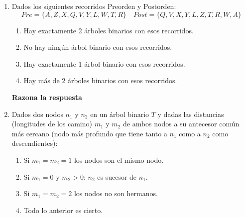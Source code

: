 \documentclass[12pt]{article}
\begin{document}
\begin{ejercicio}[1 punto]
\begin{enumerate}[label=(\alph*)]
            \item Dados los siguientes recorridos Preorden y Postorden:
                \begin{equation*}
                    Pre = \{A,Z,X,Q,V,Y,L,W,T,R\} \quad Post = \{Q,V,X,Y,L,Z,T,R,W,A\}
                \end{equation*}
                \begin{enumerate}[label=(c\arabic*)]
                    \item Hay exactamente 2 árboles binarios con esos recorridos.
                    \item No hay ningún árbol binario con esos recorridos.
                    \item Hay exactamente 1 árbol binario con esos recorridos.
                    \item Hay más de 2 árboles binarios con esos recorridos.
                \end{enumerate}
                \textbf{Razona la respuesta}

            \item Dados dos nodos $n_1$ y $n_2$ en un árbol binario $T$ y dadas las distancias (longitudes de los camino) $m_1$ y $m_2$ de ambos nodos a su antecesor común más cercano (nodo más profundo que tiene tanto a $n_1$ como a $n_2$ como descendientes):
                \begin{enumerate}[label=(d\arabic*)]
                    \item Si $m_1=m_2=1$ los nodos son el mismo nodo.
                    \item Si $m_1=0$ y $m_2>0$: $n_2$ es sucesor de $n_1$.
                    \item Si $m_1=m_2=2$ los nodos no son hermanos.
                    \item Todo lo anterior es cierto.
                \end{enumerate}
        \end{enumerate}
    \end{ejercicio}
\end{document}
